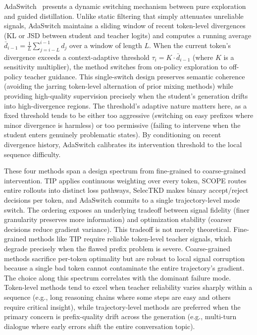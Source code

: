 \documentclass{article} %
\begin{document}
AdaSwitch~\citep{2510.07842} presents a dynamic switching mechanism between pure exploration and guided distillation. Unlike static filtering that simply attenuates unreliable signals, AdaSwitch maintains a sliding window of recent token-level divergences (KL or JSD between student and teacher logits) and computes a running average $\bar{d}_{i-1} = \frac{1}{L}\sum_{j=i-L}^{i-1} d_j$ over a window of length $L$. When the current token's divergence exceeds a context-adaptive threshold $\tau_i = K \cdot \bar{d}_{i-1}$ (where $K$ is a sensitivity multiplier), the method switches from on-policy exploration to off-policy teacher guidance. This single-switch design preserves semantic coherence (avoiding the jarring token-level alternation of prior mixing methods) while providing high-quality supervision precisely when the student's generation drifts into high-divergence regions. The threshold's adaptive nature matters here, as a fixed threshold tends to be either too aggressive (switching on easy prefixes where minor divergence is harmless) or too permissive (failing to intervene when the student enters genuinely problematic states). By conditioning on recent divergence history, AdaSwitch calibrates its intervention threshold to the local sequence difficulty.

These four methods span a design spectrum from fine-grained to coarse-grained intervention. TIP applies continuous weighting over every token, SCOPE routes entire rollouts into distinct loss pathways, SelecTKD makes binary accept/reject decisions per token, and AdaSwitch commits to a single trajectory-level mode switch. The ordering exposes an underlying tradeoff between signal fidelity (finer granularity preserves more information) and optimization stability (coarser decisions reduce gradient variance). This tradeoff is not merely theoretical. Fine-grained methods like TIP require reliable token-level teacher signals, which degrade precisely when the flawed prefix problem is severe. Coarse-grained methods sacrifice per-token optimality but are robust to local signal corruption because a single bad token cannot contaminate the entire trajectory's gradient. The choice along this spectrum correlates with the dominant failure mode. Token-level methods tend to excel when teacher reliability varies sharply within a sequence (e.g., long reasoning chains where some steps are easy and others require critical insight), while trajectory-level methods are preferred when the primary concern is prefix-quality drift across the generation (e.g., multi-turn dialogue where early errors shift the entire conversation topic).
\end{document}
